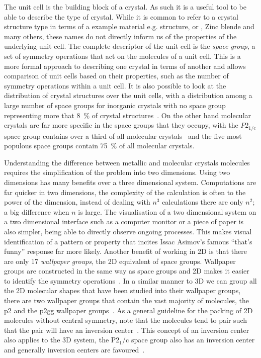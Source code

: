 The unit cell is the building block of a crystal. As such it is a useful tool to be able to describe the type of crystal. While it is common to refer to a crystal structure type in terms of a example material e.g.  structure, or , Zinc blende and many others, these names do not directly inform us of the properties of the underlying unit cell. The complete descriptor of the unit cell is the \emph{space group}, a set of symmetry operations that act on the molecules of a unit cell. This is a more formal approach to describing one crystal in terms of another and allows comparison of unit cells based on their properties, such as the number of symmetry operations within a unit cell. It is also possible to look at the distribution of crystal structures over the unit cells, with a distribution among a large number of space groups for inorganic crystals with no space group representing more that \SI{8}{\percent} of crystal structures~\cite{ursov:09}. On the other hand molecular crystals are far more specific in the space groups that they occupy, with the $P2_{1/c}$ space group contains over a third of all molecular crystals~\cite{brock:94} and the five most populous space groups contain \SI{75}{\percent} of all molecular crystals.

Understanding the difference between metallic and molecular crystals molecules requires the simplification of the problem into two dimensions. Using two dimensions has many benefits over a three dimensional system. Computations are far quicker in two dimensions, the complexity of the calculation is often to the power of the dimension, instead of dealing with $n^3$ calculations there are only $n^2$; a big difference when $n$ is large. The visualisation of a two dimensional system on a two dimensional interface such as a computer monitor or a piece of paper is also simpler, being able to directly observe ongoing processes. This makes visual identification of a pattern or property that incites Issac Asimov's famous ``that's funny'' response far more likely. Another benefit of working in 2D is that there are only 17 \emph{wallpaper groups}, the 2D equivalent of space groups. Wallpaper groups are constructed in the same way as space groups and 2D makes it easier to identify the symmetry operations~. In a similar manner to 3D we can group all the 2D molecular shapes that have been studied into their wallpaper groups, there are two wallpaper groups that contain the vast majority of molecules, the p2 and the p2gg wallpaper groups~\cite{plass:07}. As a general guideline for the packing of 2D molecules without central symmetry, \textcite{torquato:12} note that the molecules tend to pair such that the pair will have an inversion center~. This concept of an inversion center also applies to the 3D system, the P2$_1$/c space group also has an inversion center and generally inversion centers are favoured~\cite{brock:94}.

